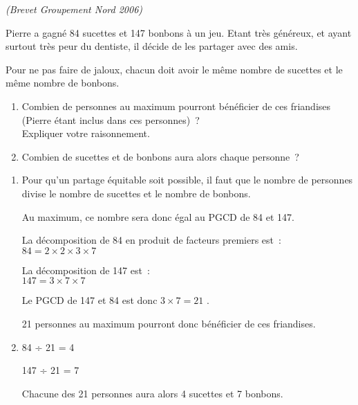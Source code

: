
\textit{(Brevet Groupement Nord 2006)}
\par
Pierre a gagné 84 sucettes et 147 bonbons à un jeu. Etant très généreux, et ayant surtout très
peur du dentiste, il décide de les partager avec des amis.
\par
Pour ne pas faire de jaloux, chacun doit avoir le même nombre de sucettes et le même nombre de bonbons.
\begin{enumerate}
     \item
     Combien de personnes au maximum pourront bénéficier de ces friandises (Pierre étant inclus dans ces personnes)~?
     \\Expliquer votre raisonnement.
     \item
     Combien de sucettes et de bonbons aura alors chaque personne~?
\end{enumerate}
\begin{corrige}
     \begin{enumerate}
          \item
          Pour qu'un partage équitable soit possible, il faut que le nombre de personnes divise le nombre de sucettes et le nombre de bonbons.
          \par
          Au maximum, ce nombre sera donc égal au PGCD de 84 et 147.
          \par
          La décomposition de 84 en produit de facteurs premiers est~:
          \\
          $ 84 = 2 \times 2 \times 3 \times 7 $
          \par
          La décomposition de 147 est~:
          \\
          $ 147 = 3 \times 7 \times 7 $
          \par
          Le PGCD de 147 et 84 est donc $3 \times 7 = 21$ .
          \par
          21 personnes au maximum pourront donc bénéficier de ces friandises.
          \item
          84 ÷ 21 = 4
          \par
          147 ÷ 21 = 7
          \par
          Chacune des 21 personnes aura alors 4 sucettes et 7 bonbons.
     \end{enumerate}
\end{corrige}


